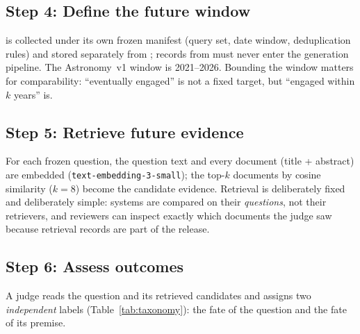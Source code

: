 \subsection{Step 4: Define the future window}
\corpusB{} is collected under its own frozen manifest (query set, date
window, deduplication rules) and stored separately from \corpusA{};
records from \corpusB{} must never enter the generation pipeline. The
Astronomy~v1 window is 2021--2026. Bounding the window matters for
comparability: ``eventually engaged'' is not a fixed target, but
``engaged within $k$ years'' is.

\subsection{Step 5: Retrieve future evidence}
For each frozen question, the question text and every \corpusB{}
document (title + abstract) are embedded
(\texttt{text-embedding-3-small}); the top-$k$ documents by cosine
similarity ($k=8$) become the candidate evidence. Retrieval is
deliberately fixed and deliberately simple: systems are compared on
their \emph{questions}, not their retrievers, and reviewers can inspect
exactly which documents the judge saw because retrieval records are part
of the release.

\subsection{Step 6: Assess outcomes}
\label{sec:protocol:outcomes}

A judge reads the question and its retrieved candidates and assigns two
\emph{independent} labels (Table~\ref{tab:taxonomy}): the fate of the
question and the fate of its premise.

